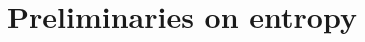 \documentclass[12pt]{amsart}
\newtheorem{theorem}{Theorem}[section]
\newtheorem{prop}[theorem]{Proposition}
\theoremstyle{definition}
\numberwithin{equation}{section}
\begin{document}
\section{Preliminaries on entropy}






\end{document}
